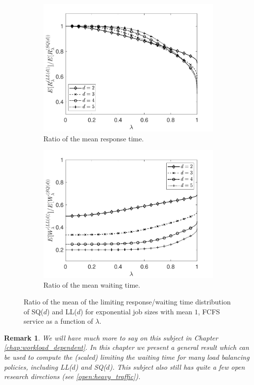 \documentclass[12pt]{report}
\newtheorem{remark}{Remark}
\begin{document}
\begin{figure}[t]
\begin{center}
\begin{subfigure}{0.45\textwidth}
\centering
\captionsetup{width=.8\linewidth}
\includegraphics[width=1\linewidth]{figures/Chapter2/fig3_2a.pdf}
\caption{ Ratio of the mean response time. }
\label{fig3.2a}
\end{subfigure}
\begin{subfigure}{.45\textwidth}
\centering
\captionsetup{width=.8\linewidth}
\includegraphics[width=1\linewidth]{figures/Chapter2/fig3_2b.pdf}
\caption{ Ratio of the mean waiting time.}
\label{fig3.2b}
\end{subfigure}
\caption{Ratio of the mean of the limiting response/waiting time distribution of SQ($d$) and LL($d$) for exponential job sizes with mean $1$, FCFS service as a function of $\lambda$.}
\label{fig3.2}
\end{center}
\end{figure}
\begin{remark}
We will have much more to say on this subject in Chapter \ref{chap:workload_dependent}. In this chapter we present a general result which can be used to compute the (scaled) limiting the waiting time for many load balancing policies, including LL($d$) and SQ($d$). This subject also still has quite a few open research directions (see \ref{open:heavy_traffic}).
\end{remark}
\end{document}
